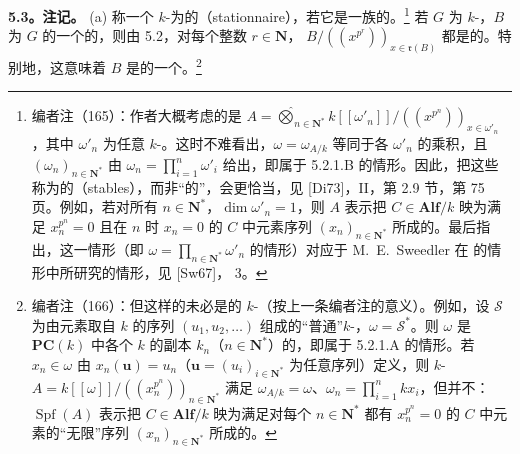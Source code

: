 \textbf{5.3。注记。} (a) 称一个 $k$-为的（stationnaire），若它是一族的。\footnote{编者注（165）：作者大概考虑的是 $A=\widehat{\bigotimes}_{n\in\mathbf N^*}k[[\omega'_n]]/((x^{p^n}))_{x\in\omega'_n}$，其中 $\omega'_n$ 为任意 $k$-。这时不难看出，$\omega=\omega_{A/k}$ 等同于各 $\omega'_n$ 的乘积，且 $(\omega_n)_{n\in\mathbf N^*}$ 由 $\omega_n=\prod_{i=1}^n\omega'_i$ 给出，即属于 5.2.1.B 的情形。因此，把这些称为的（stables），而非“的”，会更恰当，见 [Di73]，II，第 2.9 节，第 75 页。例如，若对所有 $n\in\mathbf N^*$，$\dim\omega'_n=1$，则 $A$ 表示把 $C\in\mathbf{Alf}/k$ 映为满足 $x_n^{p^n}=0$ 且在 $n$ 时 $x_n=0$ 的 $C$ 中元素序列 $(x_n)_{n\in\mathbf N^*}$ 所成的。最后指出，这一情形（即 $\omega=\prod_{n\in\mathbf N^*}\omega'_n$ 的情形）对应于 M.~E.~Sweedler 在 的情形中所研究的情形，见 [Sw67]， 3。}
若 $G$ 为 $k$-，$B$ 为 $G$ 的一个的，则由 5.2，对每个整数 $r\in\mathbf N$， $B/((x^{p^r}))_{x\in\mathfrak r(B)}$ 都是的。特别地，这意味着 $B$ 是的一个。\footnote{编者注（166）：但这样的未必是的 $k$-（按上一条编者注的意义）。例如，设 $\mathscr S$ 为由元素取自 $k$ 的序列 $(u_1,u_2,\ldots)$ 组成的“普通”$k$-，$\omega=\mathscr S^*$。则 $\omega$ 是 $\mathbf{PC}(k)$ 中各个 $k$ 的副本 $k_n$（$n\in\mathbf N^*$）的，即属于 5.2.1.A 的情形。若 $x_n\in\omega$ 由 $x_n(\mathbf u)=u_n$（$\mathbf u=(u_i)_{i\in\mathbf N^*}$ 为任意序列）定义，则 $k$- $A=k[[\omega]]/((x_n^{p^n}))_{n\in\mathbf N^*}$ 满足 $\omega_{A/k}=\omega$、$\omega_n=\prod_{i=1}^nkx_i$，但并不：$\operatorname{Spf}(A)$ 表示把 $C\in\mathbf{Alf}/k$ 映为满足对每个 $n\in\mathbf N^*$ 都有 $x_n^{p^n}=0$ 的 $C$ 中元素的“无限”序列 $(x_n)_{n\in\mathbf N^*}$ 所成的。}

